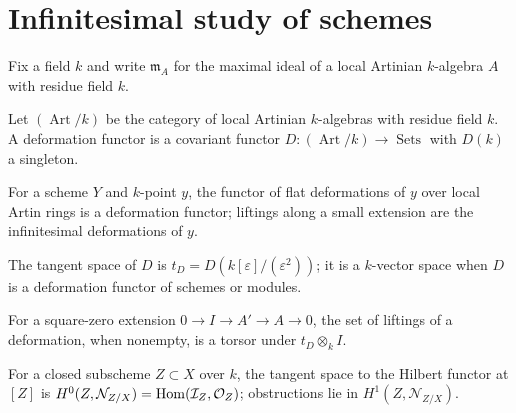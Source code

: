 \section{Infinitesimal study of schemes}

\begin{convention}\label{fga-conv-6-0}\uses{}
Fix a field $k$ and write $\mathfrak m_A$ for the maximal ideal of a local
Artinian $k$-algebra $A$ with residue field $k$.
\end{convention}\begin{definition}\label{fga-def-6-1-2}\uses{}
Let $(\operatorname{Art}/k)$ be the category of local Artinian $k$-algebras
with residue field $k$.  A deformation functor is a covariant functor
$D:(\operatorname{Art}/k)\to\operatorname{Sets}$ with $D(k)$ a singleton.
\end{definition}\begin{proposition}\label{fga-prop-6-1-4}
For a scheme $Y$ and $k$-point $y$, the functor of flat deformations of $y$
over local Artin rings is a deformation functor; liftings along a small
extension are the infinitesimal deformations of $y$.
\end{proposition}
\begin{definition}\label{fga-def-6-1-9}
The tangent space of $D$ is $t_D=D(k[\varepsilon]/(\varepsilon^2))$; it is a
$k$-vector space when $D$ is a deformation functor of schemes or modules.
\end{definition}
\begin{lemma}\label{fga-lem-6-1-17}
For a square-zero extension $0\to I\to A'\to A\to0$, the set of liftings of a
deformation, when nonempty, is a torsor under $t_D\otimes_k I$.
\end{lemma}
\begin{theorem}\label{fga-thm-6-1-19}
For a closed subscheme $Z\subset X$ over $k$, the tangent space to the Hilbert
functor at $[Z]$ is $H^0(Z,\mathcal N_{Z/X})=\operatorname{Hom}(\mathcal I_Z,
\mathcal O_Z)$; obstructions lie in $H^1(Z,\mathcal N_{Z/X})$.
\end{theorem}
